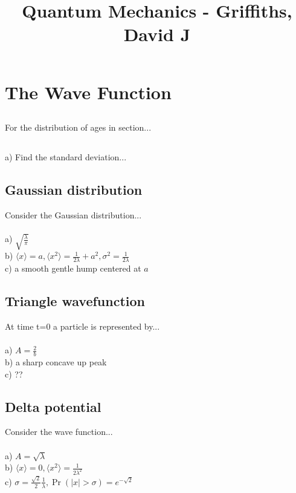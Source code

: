\documentclass{article}
\title{Quantum Mechanics - Griffiths, David J}
\date{}
\newcommand{\<}{\langle}
\renewcommand{\>}{\rangle}
\begin{document}
\maketitle

\section{The Wave Function}

\subsection{}
For the distribution of ages in section...
\subsection{}
a) Find the standard deviation...
\subsection{Gaussian distribution}
Consider the Gaussian distribution...
\\ \\
a) $\sqrt{\frac{\lambda}{\pi}}$ \\
b) $\<x\> = a, \<x^2\> = \frac{1}{2\lambda} + a^2, \sigma^2 = \frac{1}{2\lambda}$ \\
c) a smooth gentle hump centered at $a$
\subsection{Triangle wavefunction}
At time t=0 a particle is represented by...
\\ \\
a) $A = \frac{2}{b}$ \\
b) a sharp concave up peak \\
c) ??
\subsection{Delta potential}
Consider the wave function...
\\ \\
a) $A = \sqrt{\lambda}$ \\
b) $\<x\> = 0, \<x^2\> = \frac{1}{2\lambda^2}$ \\
c) $\sigma = \frac{\sqrt 2}{2} \frac{1}{\lambda}, \Pr(|x| > \sigma) = e^{-\sqrt{2}}$
\subsection{}
\end{document}
